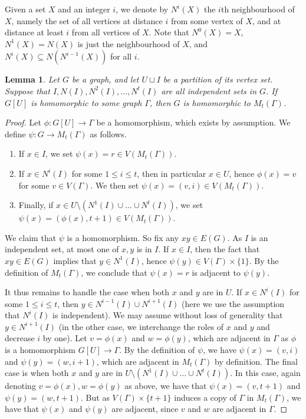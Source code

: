 \documentclass[reqno, english, 12pt]{amsart}
\theoremstyle{plain}
\newtheorem{lemma}[theorem]{Lemma}
\theoremstyle{remark}
\renewcommand{\leq}{\leqslant}
\begin{document}
Given a set $X$ and an integer $i$, we denote by $N^i(X)$ the $i$th neighbourhood of $X$, namely the set of all vertices at distance $i$ from some vertex of $X$, and at distance at least $i$ from all vertices of $X$. Note that $N^0(X) = X$, $N^1(X)=N(X)$ is just the neighbourhood of $X$, and $N^i(X) \subseteq N(N^{i-1}(X))$ for all $i$.
\begin{lemma}\label{lem:generalised extend hom}
    Let $G$ be a graph, and let $U \sqcup I$ be a partition of its vertex set. Suppose that $I,N(I),N^2(I),\dots,N^t(I)$ are all independent sets in $G$. If $G[U]$ is homomorphic to some graph $\Gamma$, then $G$ is homomorphic to $M_t(\Gamma)$.
\end{lemma}
\begin{proof}
    Let $\phi:G[U] \to \Gamma$ be a homomorphism, which exists by assumption. We define $\psi:G \to M_t(\Gamma)$ as follows.
    \begin{enumerate}
        \item If $x \in I$, we set $\psi(x)=r \in V(M_t(\Gamma))$.
        \item If $x \in N^{i}(I)$ for some $1 \leq i \leq t$, then in particular $x \in U$, hence $\phi(x) = v$ for some $v \in V(\Gamma)$. We then set $\psi(x) = (v,i) \in V(M_t(\Gamma))$.
        \item Finally, if $x \in U \setminus (N^1(I) \cup \dots \cup N^t(I))$, we set $\psi(x)=(\phi(x),t+1) \in V(M_t(\Gamma))$.
    \end{enumerate}
    We claim that $\psi$ is a homomorphism. So fix any $xy \in E(G)$. As $I$ is an independent set, at most one of $x,y$ is in $I$. If $x \in I$, then the fact that $xy \in E(G)$ implies that $y \in N^1(I)$, hence $\psi(y) \in V(\Gamma) \times \{1\}$. By the definition of $M_t(\Gamma)$, we conclude that $\psi(x)=r$ is adjacent \nolinebreak to \nolinebreak $\psi(y)$.

    It thus remains to handle the case when both $x$ and $y$ are in $U$. If $x \in N^i(I)$ for some $1 \leq i \leq t$, then $y \in N^{i-1}(I) \cup N^{i+1}(I)$ (here we use the assumption that $N^i(I)$ is independent). We may assume without loss of generality that $y \in N^{i+1}(I)$ (in the other case, we interchange the roles of $x$ and $y$ and decrease $i$ by one). Let $v = \phi(x)$ and $w = \phi(y)$, which are adjacent in $\Gamma$ as $\phi$ is a homomorphism $G[U] \to \Gamma$. By the definition of $\psi$, we have $\psi(x) = (v,i)$ and $\psi(y) = (w,i+1)$, which are adjacent in $M_t(\Gamma)$ by definition. The final case is when both $x$ and $y$ are in $U \setminus (N^1(I) \cup \dots \cup N^t(I))$. In this case, again denoting $v = \phi(x), w = \phi(y)$ as above, we have that $\psi(x) = (v,t+1)$ and $\psi(y) = (w,t+1)$. But as $V(\Gamma) \times \{t+1\}$ induces a copy of $\Gamma$ in $M_t(\Gamma)$, we have that $\psi(x)$ and $\psi(y)$ are adjacent, since $v$ and $w$ are \nolinebreak adjacent \nolinebreak in \nolinebreak $\Gamma$.
\end{proof}
\end{document}
